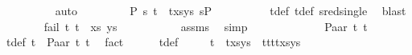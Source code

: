 \begin{isabellebody}
\ \ \ \ \ \ \ \ \isamarkupfalse%
\ auto\isanewline
\ \ \ \ \ \ \isamarkupfalse%
\ {\isachardoublequoteopen}{\isasymexists}\ P{}\ s{\isachardot}{\kern0pt}\ {\isacharparenleft}{\kern0pt}{\isacharparenleft}{\kern0pt}t{}\ {\isasymapprox}{\isacharquery}{\kern0pt}\ t{}{\isacharparenright}{\kern0pt}{\isacharhash}{\kern0pt}xs{\isacharcomma}{\kern0pt}ys{\isacharparenright}{\kern0pt}\ {\isasymTurnstile}{\isacharparenleft}{\kern0pt}{\isacharbraceleft}{\kern0pt}{\isacharbraceright}{\kern0pt}{\isacharcomma}{\kern0pt}s{\isacharparenright}{\kern0pt}{\isasymRightarrow}P{}{\isachardoublequoteclose}\isanewline
\ \ \ \ \ \ \ \ \isamarkupfalse%
\ t{}{\isacharunderscore}{\kern0pt}def\ t{}{\isacharunderscore}{\kern0pt}def\ sred{\isacharunderscore}{\kern0pt}single\ \isamarkupfalse%
\ blast\isanewline
\ \ \ \ \ \ \isamarkupfalse%
\ {\isachardoublequoteopen}fail\ {\isacharparenleft}{\kern0pt}{\isacharparenleft}{\kern0pt}t{}{\isacharcomma}{\kern0pt}\ t{}{\isacharparenright}{\kern0pt}\ {\isacharhash}{\kern0pt}\ xs{\isacharcomma}{\kern0pt}\ ys{\isacharparenright}{\kern0pt}{\isachardoublequoteclose}\ \isanewline
\ \ \ \ \ \ \ \ \isamarkupfalse%
\ assms\ \isamarkupfalse%
\ simp\isanewline
\ \ \ \ \isamarkupfalse%
\isanewline
\ \ \isamarkupfalse%
\isanewline
\ \ \ \ \isamarkupfalse%
\ {\isacharparenleft}{\kern0pt}Paar\ t{}{}\ t{}{}{\isacharparenright}{\kern0pt}\isanewline
\ \ \ \ \isamarkupfalse%
\ t{}{\isacharunderscore}{\kern0pt}def{\isacharcolon}{\kern0pt}\ {\isachardoublequoteopen}t{}\ {\isacharequal}{\kern0pt}\ Paar\ t{}{}\ t{}{}{\isachardoublequoteclose}\ \isamarkupfalse%
\ fact\isanewline
\ \ \ \ \isamarkupfalse%
\ t{}{\isacharunderscore}{\kern0pt}def\ \isamarkupfalse%
\isanewline
\ \ \ \ {\isachardoublequoteopen}{\isacharparenleft}{\kern0pt}{\isacharparenleft}{\kern0pt}t{}\ {\isasymapprox}{\isacharquery}{\kern0pt}\ t{}{\isacharparenright}{\kern0pt}{\isacharhash}{\kern0pt}xs{\isacharcomma}{\kern0pt}ys{\isacharparenright}{\kern0pt}\ {\isasymturnstile}{\isacharbrackleft}{\kern0pt}{\isacharbrackright}{\kern0pt}{\isasymleadsto}\ {\isacharparenleft}{\kern0pt}{\isacharparenleft}{\kern0pt}t{}{}{\isasymapprox}{\isacharquery}{\kern0pt}t{}{}{\isacharparenright}{\kern0pt}{\isacharhash}{\kern0pt}{\isacharparenleft}{\kern0pt}t{}{}{\isasymapprox}{\isacharquery}{\kern0pt}t{}{}{\isacharparenright}{\kern0pt}{\isacharhash}{\kern0pt}xs{\isacharcomma}{\kern0pt}ys{\isacharparenright}{\kern0pt}{\isachardoublequoteclose}\isanewline

\end{isabellebody}
